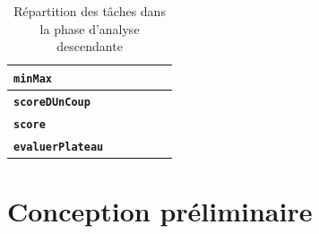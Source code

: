 \documentclass[11pt]{report}
\begin{document}
\begin{table}[h]
\begin{center}
\begin{tabular}{|l|c|c|c|c|c|}
   		\textbf{\texttt{minMax}} & & & &  \cellcolor{lightgray}&  \cellcolor{lightgray}  \\\hline
   		 		\textbf{\texttt{scoreDUnCoup}} & & & &  \cellcolor{lightgray}&  \cellcolor{lightgray}  \\\hline
   	 		\textbf{\texttt{score}} & & & &  \cellcolor{lightgray}&  \cellcolor{lightgray}  \\\hline
   	 		 		\textbf{\texttt{evaluerPlateau}} & & & &  \cellcolor{lightgray}&  \cellcolor{lightgray}  \\\hline
\end{tabular}
\end{center}
\caption{Répartition des tâches dans la phase d'analyse descendante}
\end{table}


\chapter{Conception préliminaire}
\end{document}
